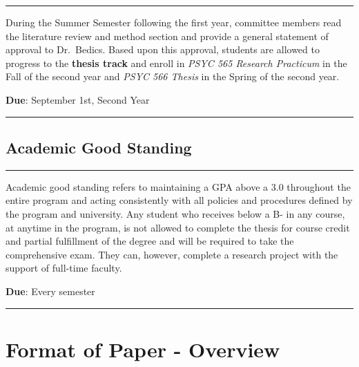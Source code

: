 \documentclass[
  openany]{book}
\begin{document}
\begin{center}\rule{0.5\linewidth}{0.5pt}\end{center}

During the Summer Semester following the first year, committee members read the literature review and method section and provide a general statement of approval to Dr.~Bedics. Based upon this approval, students are allowed to progress to the \textbf{thesis track} and enroll in \emph{PSYC 565 Research Practicum} in the Fall of the second year and \emph{PSYC 566 Thesis} in the Spring of the second year.

\textbf{Due}: September 1st, Second Year

\begin{center}\rule{0.5\linewidth}{0.5pt}\end{center}

\hypertarget{academic-good-standing}{%
\section{Academic Good Standing}\label{academic-good-standing}}

\begin{center}\rule{0.5\linewidth}{0.5pt}\end{center}

Academic good standing refers to maintaining a GPA above a 3.0 throughout the entire program and acting consistently with all policies and procedures defined by the program and university. Any student who receives below a B- in any course, at anytime in the program, is not allowed to complete the thesis for course credit and partial fulfillment of the degree and will be required to take the comprehensive exam. They can, however, complete a research project with the support of full-time faculty.

\textbf{Due}: Every semester

\begin{center}\rule{0.5\linewidth}{0.5pt}\end{center}

\hypertarget{format}{%
\chapter{Format of Paper - Overview}\label{format}}
\end{document}

